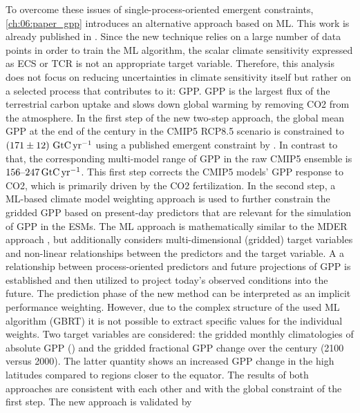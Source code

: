To overcome these issues of single-process-oriented emergent constraints,
\cref{ch:06:paper_gpp} introduces an alternative approach based on \ac{ML}.
This work is already published in \textcite{Schlund2020}. Since the new
technique relies on a large number of data points in order to train the \ac{ML}
algorithm, the scalar climate sensitivity expressed as \ac{ECS} or \ac{TCR} is
not an appropriate target variable. Therefore, this analysis does not focus on
reducing uncertainties in climate sensitivity itself but rather on a selected
process that contributes to it: \ac{GPP}. \Ac{GPP} is the largest flux of the
terrestrial carbon uptake and slows down global warming by removing \ac{CO2}
from the atmosphere. In the first step of the new two-step approach, the global
mean \ac{GPP} at the end of the  century in the \acs{CMIP}5
\acs{RCP}8.5 scenario is constrained to $\pmrangeunit{171}{12}{\GtCyr{}}$ using
a published emergent constraint by \textcite{Wenzel2016}. In contrast to that,
the corresponding multi-model range of \ac{GPP} in the raw \acs{CMIP}5 ensemble
is $\rangeunit{156}{247}{\GtCyr{}}$. This first step corrects the \acs{CMIP}5
models' \ac{GPP} response to \ac{CO2}, which is primarily driven by the
\ac{CO2} fertilization. In the second step, a \ac{ML}-based climate model
weighting approach is used to further constrain the gridded \ac{GPP} based on
present-day predictors that are relevant for the simulation of \ac{GPP} in the
\acp{ESM}. The \ac{ML} approach is mathematically similar to the \ac{MDER}
approach \autocite{Karpechko2013, Senftleben2020, Wenzel2016a}, but
additionally considers multi-dimensional (gridded) target variables and
non-linear relationships between the predictors and the target variable. A a
relationship between process-oriented predictors and future projections of
\ac{GPP} is established and then utilized to project today's observed
conditions into the future. The prediction phase of the new method can be
interpreted as an implicit performance weighting. However, due to the complex
structure of the used \ac{ML} algorithm (\ac{GBRT}) it is not possible to
extract specific values for the individual weights. Two target variables are
considered: the gridded monthly climatologies of absolute \ac{GPP}
() and the gridded fractional \ac{GPP} change over the
 century (2100 versus 2000). The latter quantity shows an increased
\acs{GPP} change in the high latitudes compared to regions closer to the
equator. The results of both approaches are consistent with each other and with
the global constraint of the first step. The new approach is validated by
